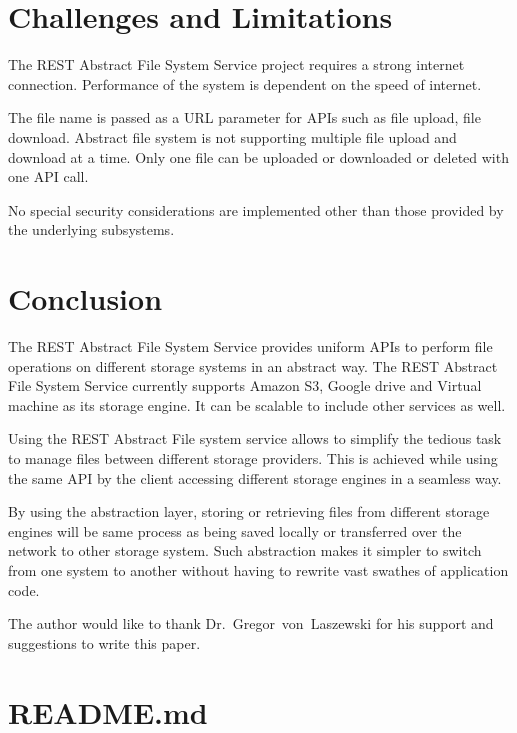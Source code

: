 \section{Challenges and Limitations}

The REST Abstract File System Service project requires a strong
internet connection.  Performance of the system is dependent on the
speed of internet.

The file name is passed as a URL parameter for APIs such as file upload,
file download. Abstract file system is not supporting multiple file 
upload and download at a time. Only one file can be uploaded or 
downloaded or deleted with one API call. 

No special security considerations are implemented other than those provided
by the underlying subsystems.

\section{Conclusion}

The REST Abstract File System Service provides uniform APIs to perform
file operations on different storage systems in an abstract way. The
REST Abstract File System Service currently supports Amazon S3, Google
drive and Virtual machine as its storage engine. It can be scalable to
include other services as well.


Using the REST Abstract File system service allows to simplify the
tedious task to manage files between different storage providers. This
is achieved while using the same API by the client accessing different
storage engines in a seamless way.


By using the abstraction layer, storing or retrieving files from
different storage engines will be same process as being saved locally
or transferred over the network to other storage system. Such
abstraction makes it simpler to switch from one system to another
without having to rewrite vast swathes of application code.



\begin{acks}

  The author would like to thank Dr.~Gregor~von~Laszewski for his
  support and suggestions to write this paper.

\end{acks}


 

\appendix

\section{README.md}


